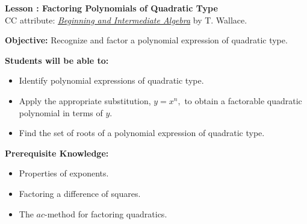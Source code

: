 \documentclass[12pt]{article}
\theoremstyle{definition}
\begin{document}
{\bf \large Lesson : Factoring Polynomials of Quadratic Type}
\\ CC attribute: \href{http://www.wallace.ccfaculty.org/book/book.html}{\it{Beginning and Intermediate Algebra}} by T. Wallace. 
\hfill \doclicenseImage[imagewidth=5em]\\
\par
{\bf Objective:} Recognize and factor a polynomial expression of quadratic type.\\
\par
{\bf Students will be able to:}
\begin{itemize}
	\item Identify polynomial expressions of quadratic type.
	\item Apply the appropriate substitution, $y=x^n,$ to obtain a factorable quadratic polynomial in terms of $y$.
	\item Find the set of roots of a polynomial expression of quadratic type.
\end{itemize}
{\bf Prerequisite Knowledge:}
\begin{itemize}
	\item Properties of exponents.
	\item Factoring a difference of squares.
	\item The $ac$-method for factoring quadratics.
\end{itemize}
\hrulefill
\end{document}
